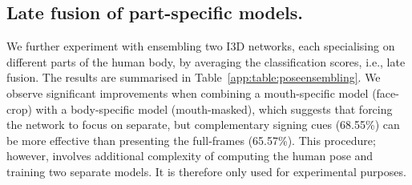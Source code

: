 \begin{table}[h!]
    \centering
    \caption{Ensembling part-specific models from 
        Table~\ref{table:pose2sign}.
We observe that combining the I3D model trained only with the face
        and another model without the mouth (last row) achieves
        superior performance than using one model that inputs the
        full-frame. This suggests that disentangling manual and non-manual
        features, which are complementary, for sign recognition is a promising direction.
        The models are trained on
        the subset of \datasetName{}$_{m.8}$ where pose estimates are available.
    }
    \label{app:table:poseensembling}
\end{table}


\subsection{Late fusion of part-specific models.} \label{app:subsec:fusion}
We further experiment with ensembling two I3D networks,
each specialising on different parts of the human body,
by averaging the classification scores, i.e., late fusion.
The results are summarised in Table~\ref{app:table:poseensembling}.
We observe significant improvements
when combining a mouth-specific model (face-crop)
with a body-specific model (mouth-masked),
which suggests that forcing the network to
focus on separate, but complementary signing cues (68.55\%)
can be more effective than presenting the full-frames (65.57\%).
This procedure; however, involves additional complexity
of computing the human pose and training two separate models.
It is therefore only used for experimental purposes.

